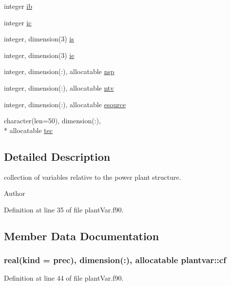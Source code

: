 \begin{DoxyCompactItemize}
integer \hyperlink{classplantvar_a1ee94e03e80cea12dff918a70f1a7993}{ib}
\item 
integer \hyperlink{classplantvar_ad912cbd511b056bee83744eefe0c0ef8}{ic}
\item 
integer, dimension(3) \hyperlink{classplantvar_add18a489fead102059c74cf8875f94e0}{is}
\item 
integer, dimension(3) \hyperlink{classplantvar_a9a1a47dc2865d900ce5834934d4c6c06}{ie}
\item 
integer, dimension(\-:), allocatable \hyperlink{classplantvar_a16e98f1a836d4de3e5436365e77441b0}{nsp}
\item 
integer, dimension(\-:), allocatable \hyperlink{classplantvar_a019098844671b06b71ae0b76aa3d4fa8}{ntv}
\item 
integer, dimension(\-:), allocatable \hyperlink{classplantvar_ac5590ecfa29690829feb06fd8c1eb839}{esource}
\item 
character(len=50), dimension(\-:), \\*
allocatable \hyperlink{classplantvar_a4de39d7f2e55534eeac1a570bf8d30ff}{tec}
\end{DoxyCompactItemize}


\subsection{Detailed Description}
collection of variables relative to the power plant structure. \begin{DoxyAuthor}{Author}

\end{DoxyAuthor}


Definition at line 35 of file plant\-Var.\-f90.



\subsection{Member Data Documentation}
\hypertarget{classplantvar_af0df4533997b17a1fd69f0c152ce2804}{
\subsubsection[{cf}]{\setlength{\rightskip}{0pt plus 5cm}real(kind = prec), dimension(\-:), allocatable plantvar\-::cf}}\label{classplantvar_af0df4533997b17a1fd69f0c152ce2804}


Definition at line 44 of file plant\-Var.\-f90.

